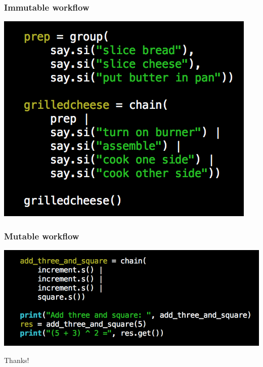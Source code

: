 \documentclass{beamer}
\begin{document}
\begin{frame}
  \frametitle{Immutable workflow}
  \begin{center}
  \includegraphics[scale=0.4]{wf1.png}
  \end{center}
\end{frame}

\begin{frame}
  \frametitle{Mutable workflow}
  \begin{center}
  \includegraphics[scale=0.35]{wf2.png}
    
  \end{center}
\end{frame}

\begin{frame}
  \begin{LARGE}
    \begin{center}
      Thanks!
    \end{center}
  \end{LARGE}
\end{frame}
\end{document}
